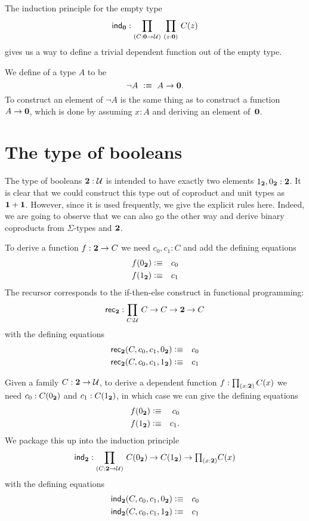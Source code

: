The induction principle for the empty type
\[ \ind{\emptyt} : \prd{C:\emptyt \to \UU}{z:\emptyt} C(z) \]
gives us a way to define a trivial dependent function out of the
empty type. %

We define  of a type $A$ to be
%
\begin{equation*}
  \neg A \ \vcentcolon\equiv\ A \to \mathbf{0}.
\end{equation*}
%
To construct an element of $\neg A$ is the same thing as to construct a function $A \to
\mathbf{0}$, which is done by assuming $x : A$ and deriving an element of~$\mathbf{0}$.

\section{The type of booleans}
\label{sec:type-booleans}

The type of booleans $\mathbf{2}:\mathcal{U}$ is intended to have exactly two elements 
${1_{\mathbf{2}}},{0_{\mathbf{2}}} : \mathbf{2}$. It is clear that we could construct this
type out of coproduct and unit types as $\mathbf{1} + \mathbf{1}$. However,
since it is used frequently, we give the explicit rules here.
Indeed, we are going to observe that we can also go the other way
and derive binary coproducts from $\Sigma$-types and $\mathbf{2}$.

To derive a function $f : \mathbf{2} \to C$ we need $c_0,c_1 : C$ and
add the defining equations
\begin{eqnarray*}
  f({0_{\mathbf{2}}}) & \vcentcolon\equiv & c_0 \\
  f({1_{\mathbf{2}}}) & \vcentcolon\equiv & c_1
\end{eqnarray*}
The recursor corresponds to the if-then-else construct in
functional programming:
\[ \rec{\bool} : \prd{C:\UU}  C \to C \to \bool \to C \]
with the defining equations
\begin{eqnarray*}
  \mathsf{rec}_{\mathbf{2}}(C,c_0,c_1,{0_{\mathbf{2}}}) & \vcentcolon\equiv & c_0 \\
  \mathsf{rec}_{\mathbf{2}}(C,c_0,c_1,{1_{\mathbf{2}}}) & \vcentcolon\equiv & c_1
\end{eqnarray*}

Given a family $C : \mathbf{2} \to \mathcal{U}$, to derive a dependent function 
$f : \prd{x:\bool}C(x)$ we need $c_0:C({0_{\mathbf{2}}})$ and $c_1 : C({1_{\mathbf{2}}})$, in which case we can give the defining equations
\begin{eqnarray*}
  f({0_{\mathbf{2}}}) & \vcentcolon\equiv & c_0 \\
  f({1_{\mathbf{2}}}) & \vcentcolon\equiv & c_1.
\end{eqnarray*}
We package this up into the induction principle
\[ \ind{\bool} : \dprd{C:\bool \to \UU}  C(\bfalse) \to C(\btrue)
\to \tprd{x:\bool} C(x) \]
with the defining equations
\begin{eqnarray*}
  \mathsf{ind}_{\mathbf{2}}(C,c_0,c_1,{0_{\mathbf{2}}}) & \vcentcolon\equiv & c_0 \\
  \mathsf{ind}_{\mathbf{2}}(C,c_0,c_1,{1_{\mathbf{2}}}) & \vcentcolon\equiv & c_1
\end{eqnarray*}

